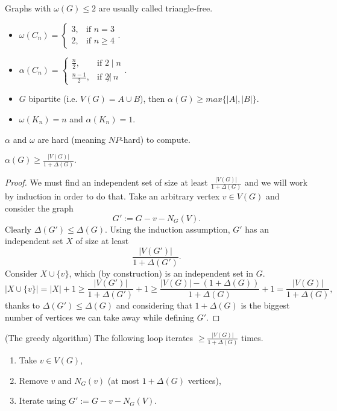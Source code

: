 \begin{definition} Graphs with $\omega(G)\leqslant 2$ are usually called triangle-free.
\end{definition}

\begin{example}
\begin{itemize}
\item $\omega(C_n)=
\begin{cases} 
3, & \text{if } n=3\\ 
2, & \text{if } n\geqslant 4
\end{cases}.$
\item $\alpha(C_n)=
\begin{cases} 
\frac{n}{2}, & \text{if } 2\mid n\\ 
\frac{n-1}{2}, & \text{if } 2\not| \ n
\end{cases}.$
\item $G$ bipartite (i.e. $V(G)=A\cup B$), then $\alpha(G)\geqslant max\{|A|,|B|\}$.
\item $\omega(K_n)=n$ and $\alpha(K_n)=1$.
\end{itemize}
\end{example}

\begin{remark} $\alpha$ and $\omega$ are hard (meaning $NP$-hard) to compute.
\end{remark}

\begin{lemma}
$\alpha(G)\geqslant \frac{|V(G)|}{1+\Delta(G)}$.
\end{lemma}

\begin{proof} We must find an independent set of size at least $\frac{|V(G)|}{1+\Delta(G)}$ and we will work by induction in order to do that. Take an arbitrary vertex $v\in V(G)$ and consider the graph 
$$G':=G-v-N_G(V).$$
Clearly $\Delta(G')\leqslant \Delta(G)$. Using the induction assumption, $G'$ has an independent set $X$ of size at least
$$\frac{|V(G')|}{1+\Delta(G')}.$$
Consider $X\cup \{v\}$, which (by construction) is an independent set in $G$.
$$|X\cup \{v\}|=|X|+1\geqslant\frac{|V(G')|}{1+\Delta(G')}+1\geqslant \frac{|V(G)|-(1+\Delta(G))}{1+\Delta(G)}+1=\frac{|V(G)|}{1+\Delta(G)},$$
thanks to $\Delta(G')\leqslant \Delta(G)$ and considering that $1+\Delta(G)$ is the biggest number of vertices we can take away while defining $G'$.
\end{proof}

(The greedy algorithm) The following loop iterates $\geqslant \frac{|V(G)|}{1+\Delta(G)}$ times.
\begin{enumerate}
\item Take $v\in V(G)$,
\item Remove $v$ and $N_G(v)$ (at most $1+\Delta(G)$ vertices),
\item Iterate using $G':=G-v-N_G(V)$.
\end{enumerate}

